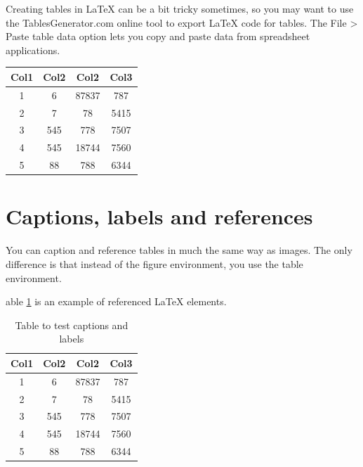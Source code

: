 \documentclass[12pt, a4paper]{report}
\begin{document}
Creating tables in LaTeX can be a bit tricky sometimes, so you may want to use the TablesGenerator.com online tool to export LaTeX code for tables. The File > Paste table data option lets you copy and paste data from spreadsheet applications.

\begin{center}
    \begin{tabular}{||c c c c||}
        \hline
        Col1 & Col2 & Col2  & Col3 \\ [0.5ex]
        \hline\hline
        1    & 6    & 87837 & 787  \\
        \hline
        2    & 7    & 78    & 5415 \\
        \hline
        3    & 545  & 778   & 7507 \\
        \hline
        4    & 545  & 18744 & 7560 \\
        \hline
        5    & 88   & 788   & 6344 \\ [1ex]
        \hline
    \end{tabular}
\end{center}

\section{Captions, labels and references}

You can caption and reference tables in much the same way as images. The only difference is that instead of the figure environment, you use the table environment.

able \ref{table:data} is an example of referenced \LaTeX{} elements.

\begin{table}[h!]
    \centering
    \begin{tabular}{||c c c c||}
        \hline
        Col1 & Col2 & Col2  & Col3 \\ [0.5ex]
        \hline\hline
        1    & 6    & 87837 & 787  \\
        2    & 7    & 78    & 5415 \\
        3    & 545  & 778   & 7507 \\
        4    & 545  & 18744 & 7560 \\
        5    & 88   & 788   & 6344 \\ [1ex]
        \hline
    \end{tabular}
    \caption{Table to test captions and labels}
    \label{table:data}
\end{table}
\end{document}
